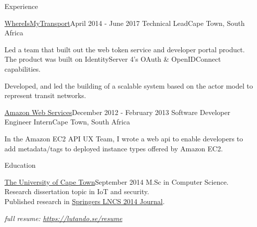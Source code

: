 \documentclass{resume} %
\begin{document}
\begin{rSection}{Experience}
        \begin{rSubsection}
            {\href{https://www.whereismytransport.com/}{WhereIsMyTransport}}{April 2014 - June 2017}
            {Technical Lead}{Cape Town, South Africa}
            
            \item Led a team that built out the web token service and developer portal product.
                The product was built on IdentityServer 4's OAuth \& OpenIDConnect capabilities.
            
            \item Developed, and led the building of a scalable system based on the actor model to represent transit
            networks.
                
        \end{rSubsection}

        \begin{rSubsection}
            {\href{https://aws.amazon.com/}{Amazon Web Services}}{December 2012 - February 2013}
            {Software Developer Engineer Intern}{Cape Town, South Africa}
            
            \item In the Amazon EC2 API UX Team, I wrote a web api to enable 
                developers to add metadata/tags to deployed instance types offered by Amazon EC2.
                
        \end{rSubsection}

    \end{rSection}

    
    \begin{rSection}{Education}


        \begin{rSubsection}
            {\href{http://www.uct.ac.za/}{The University of Cape Town}}{September 2014}{}{}
            M.Sc in Computer Science. Research dissertation topic in IoT and security. \\
            Published research in \href{https://link.springer.com/chapter/10.1007/978-3-319-13174-0_12}{Springers LNCS 2014 Journal}. \\
                \begin{center}
                    \textit{full resume: \url{https://lutando.se/resume}}
                \end{center}
        \end{rSubsection}

    \end{rSection}
\end{document}
